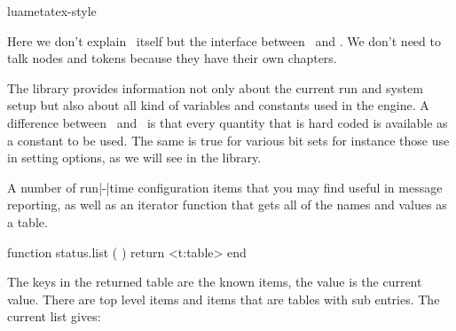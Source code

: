 










\environment luametatex-style

\startdocument[title=\TEX,xtitle=\TEX]

\startsection[title={Introduction}]

Here we don't explain \TEX\ itself but the interface between \TEX\ and \LUA. We
don't need to talk nodes and tokens because they have their own chapters.

\stopsection

\startsection[title={Status information}]

The  library provides information not only about the current run
and system setup but also about all kind of variables and constants used in the
engine. A difference between \LUATEX\ and \LUAMETATEX\ is that every quantity
that is hard coded is available as a constant to be used. The same is true for
various bit sets for instance those use in setting options, as we will see in the
 library.

A number of run|-|time configuration items that you may find useful
in message reporting, as well as an iterator function that gets all of the names
and values as a table.

\starttyping[option=LUA]
function status.list ( )
    return <t:table>
end
\stoptyping

The keys in the returned table are the known items, the value is the current
value. There are top level items and items that are tables with sub entries. The
current list gives:

